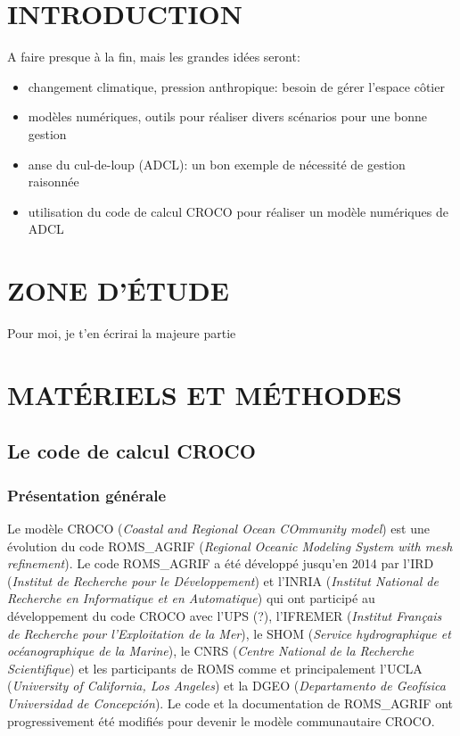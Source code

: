 \documentclass[10pt,a4paper,titlepage]{article}
\begin{document}
\tableofcontents
\newpage

\section{INTRODUCTION}

A faire presque à la fin, mais les grandes idées seront:
\begin{itemize}
    \item changement climatique, pression anthropique: besoin de gérer l'espace côtier
    \item modèles numériques, outils pour réaliser divers scénarios pour une bonne gestion
    \item anse du cul-de-loup (ADCL): un bon exemple de nécessité de gestion raisonnée
    \item utilisation du code de calcul CROCO pour réaliser un modèle numériques de ADCL
\end{itemize}

\newpage

\section{ZONE D'ÉTUDE}

Pour moi, je t'en écrirai la majeure partie

\newpage

\section{MATÉRIELS ET MÉTHODES}
\subsection{Le code de calcul CROCO}

\subsubsection{Présentation générale}
Le modèle CROCO (\textit{Coastal and Regional Ocean COmmunity model}) est une évolution du code ROMS\_AGRIF (\textit{Regional Oceanic Modeling System with mesh refinement}).
Le code ROMS\_AGRIF a été développé jusqu'en 2014 par l'IRD (\textit{Institut de Recherche pour le Développement}) et l'INRIA (\textit{Institut National de Recherche en Informatique et en Automatique}) qui ont participé au développement du code CROCO avec
l'UPS (?), 
l'IFREMER (\textit{Institut Français de Recherche pour l'Exploitation de la Mer}), 
le SHOM (\textit{Service hydrographique et océanographique de la Marine}), 
le CNRS (\textit{Centre National de la Recherche Scientifique})
 et les participants de ROMS comme et principalement 
l'UCLA (\textit{University of California, Los Angeles}) 
et la DGEO (\textit{Departamento de Geofísica Universidad de Concepción}). 
Le code et la documentation de ROMS\_AGRIF ont progressivement été modifiés pour devenir le modèle communautaire CROCO.
\end{document}
